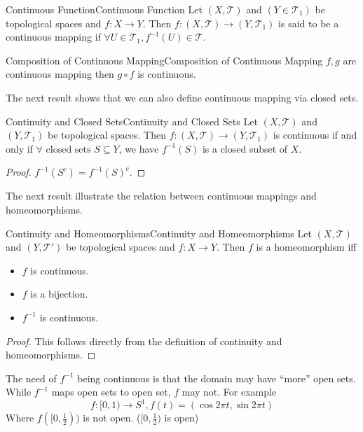 \documentclass[../main.tex]{subfiles}
\begin{document}
\begin{definition}{Continuous Function}{Continuous Function}
Let $(X,\mathcal{T})$ and $(Y\in \mathcal{T}_1)$ be topological spaces and $f:X \rightarrow Y$. Then $f:(X,\mathcal{T})\rightarrow (Y,\mathcal{T}_1)$ is said to be a continuous mapping if $\forall U\in \mathcal{T}_1, f^{-1}(U)\in \mathcal{T}$.
\end{definition}

\begin{proposition}{Composition of Continuous Mapping}{Composition of Continuous Mapping}
$f,g$ are continuous mapping then $g \circ f$ is continuous.
\end{proposition}

The next result shows that we can also define continuous mapping via closed sets.
\begin{theorem}{Continuity and Closed Sets}{Continuity and Closed Sets}
Let $(X,\mathcal{T})$ and $(Y,\mathcal{T}_1)$ be topological spaces. Then $f: (X,\mathcal{T})\rightarrow (Y,\mathcal{T}_1)$ is continuous if and only if $\forall \text{ closed sets }S \subseteq Y$, we have $f^{-1}(S)$ is a closed subset of $X$.
\end{theorem}
\begin{proof}
$f^{-1}(S^c) = f^{-1}(S)^c$.
\end{proof}

The next result illustrate the relation between continuous mappings and homeomorphisms.
\begin{theorem}{Continuity and Homeomorphisms}{Continuity and Homeomorphisms}
Let $(X,\mathcal{T})$ and $(Y,\mathcal{T}')$ be topological spaces and $f:X \rightarrow Y$. Then $f$ is a homeomorphism iff
\begin{itemize}
\item $f$ is continuous.
\item  $f$ is a bijection.
\item $f^{-1}$ is continuous.
\end{itemize}
\end{theorem}
\begin{proof}
This follows directly from the definition of continuity and homeomorphisms.
\end{proof}
\begin{remark}
The need of $f^{-1}$ being continuous is that the domain may have ``more'' open sets. While $f^{-1}$ maps open sets to open set, $f$ may not. For example
\begin{equation*}
f: [0,1) \rightarrow S^1, f(t) = (\cos 2\pi t,\sin 2\pi t)
\end{equation*}
Where $f([0,\frac{1}{2}))$ is not open. ($[0,\frac{1}{2})$ is open)
\end{remark}
\end{document}
